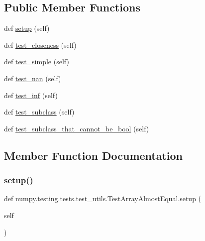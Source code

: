 \subsection*{Public Member Functions}
\begin{DoxyCompactItemize}
\item 
def \hyperlink{classnumpy_1_1testing_1_1tests_1_1test__utils_1_1TestArrayAlmostEqual_aa724da6cce49996c6d31813e99cf481c}{setup} (self)
\item 
def \hyperlink{classnumpy_1_1testing_1_1tests_1_1test__utils_1_1TestArrayAlmostEqual_a1a23b204f50e27aa60d0bd803049b2cb}{test\+\_\+closeness} (self)
\item 
def \hyperlink{classnumpy_1_1testing_1_1tests_1_1test__utils_1_1TestArrayAlmostEqual_a306216cbbf86ce760a922ee5f6b3e833}{test\+\_\+simple} (self)
\item 
def \hyperlink{classnumpy_1_1testing_1_1tests_1_1test__utils_1_1TestArrayAlmostEqual_a13afae63a62dabe38e042dd29a5de240}{test\+\_\+nan} (self)
\item 
def \hyperlink{classnumpy_1_1testing_1_1tests_1_1test__utils_1_1TestArrayAlmostEqual_a5d164ccf9ac04a5ec2f4174dc18f6465}{test\+\_\+inf} (self)
\item 
def \hyperlink{classnumpy_1_1testing_1_1tests_1_1test__utils_1_1TestArrayAlmostEqual_a8899971449ac7a14746a48f53219e338}{test\+\_\+subclass} (self)
\item 
def \hyperlink{classnumpy_1_1testing_1_1tests_1_1test__utils_1_1TestArrayAlmostEqual_ac14074d3831a5792dd2f3979994a4a65}{test\+\_\+subclass\+\_\+that\+\_\+cannot\+\_\+be\+\_\+bool} (self)
\end{DoxyCompactItemize}


\subsection{Member Function Documentation}
\mbox{\label{classnumpy_1_1testing_1_1tests_1_1test__utils_1_1TestArrayAlmostEqual_aa724da6cce49996c6d31813e99cf481c}} 
\subsubsection{\texorpdfstring{setup()}{setup()}}
{\footnotesize\ttfamily def numpy.\+testing.\+tests.\+test\+\_\+utils.\+Test\+Array\+Almost\+Equal.\+setup (\begin{DoxyParamCaption}\item[{}]{self }\end{DoxyParamCaption})}

